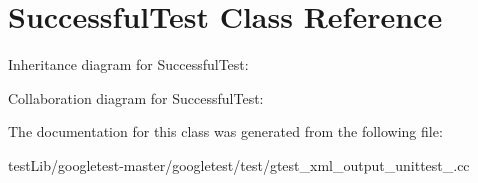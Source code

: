 \hypertarget{classSuccessfulTest}{}\section{Successful\+Test Class Reference}
\label{classSuccessfulTest}


Inheritance diagram for Successful\+Test\+:


Collaboration diagram for Successful\+Test\+:


The documentation for this class was generated from the following file\+:\begin{DoxyCompactItemize}
\item 
test\+Lib/googletest-\/master/googletest/test/gtest\+\_\+xml\+\_\+output\+\_\+unittest\+\_\+.\+cc\end{DoxyCompactItemize}
